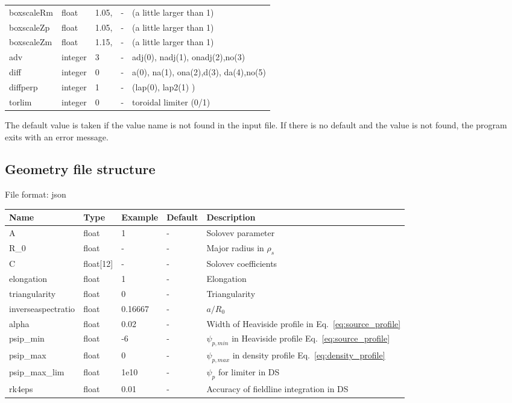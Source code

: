 \begin{longtable}{llll>{\RaggedRight}p{7cm}}
  boxscaleRm & float &  1.05, & - & (a little larger than 1) \\
  boxscaleZp & float &  1.05, & - & (a little larger than 1) \\
  boxscaleZm & float &  1.15, & - & (a little larger than 1) \\
  adv        & integer & 3 & - & adj(0), nadj(1), onadj(2),no(3) \\
  diff       & integer & 0 & - & a(0), na(1), ona(2),d(3), da(4),no(5) \\
  diffperp   & integer & 1 & - & (lap(0), lap2(1) ) \\
  torlim     & integer & 0 & - & toroidal limiter (0/1) \\
\bottomrule
\end{longtable}

The default value is taken if the value name is not found in the input file. If there is no default and
the value is not found,
the program exits with an error message.

\subsection{Geometry file structure}
File format: json

\begin{longtable}{llll>{\RaggedRight}p{7cm}}
\toprule
\rowcolor{gray!50}\textbf{Name} &  \textbf{Type} & \textbf{Example} & \textbf{Default} & \textbf{Description}  \\ \midrule
    A      & float & 1 &  - & Solovev parameter \\
    R\_0   & float & - & -  & Major radius in $\rho_s$ \\
    C      & float[12] &  - & - & Solovev coefficients \\
    elongation & float & 1 & - & Elongation \\
    triangularity & float & 0 & - & Triangularity \\
    inverseaspectratio & float & 0.16667 & - & $a/R_0$ \\
    alpha  & float & 0.02 & - & Width of Heaviside profile in Eq.~\eqref{eq:source_profile} \\
    psip\_min & float & -6 & - & $\psi_{p,min}$ in Heaviside profile Eq.~\eqref{eq:source_profile} \\
    psip\_max & float & 0 & - & $\psi_{p,max}$ in density profile Eq.~\eqref{eq:density_profile} \\
    psip\_max\_lim & float & 1e10 & - & $\psi_p$ for limiter in DS \\
    rk4eps & float & 0.01 & - & Accuracy of fieldline integration in DS \\
\bottomrule
\end{longtable}

